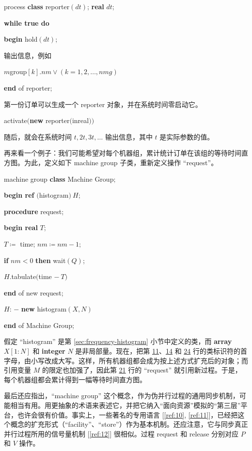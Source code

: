 \quad process \textbf{class} reporter$(dt)$; \textbf{real} $dt$;

\quad \textbf{while true do}

\quad \textbf{}\textbf{begin} hold$(dt)$;

\quad \quad 输出信息，例如

\quad \quad $m$group$[k].nm \lor (k = 1, 2, \dots,nmg)$

\quad \textbf{end} of reporter;

第一份订单可以生成一个 reporter 对象，并在系统时间零启动它。

\quad activate$($\textbf{new} reporter$($inreal$))$

\noindent
随后，就会在系统时间 $t, 2t, 3t, \dots$ 输出信息，其中 $t$ 是实际参数的值。

再来看一个例子：我们可能希望对每个机器组，累计统计订单在该组的等待时间直方图。为此，定义如下 machine group 子类，重新定义操作 ``request''。

\quad machine group \textbf{class} Machine Group;

\quad \textbf{begin ref} $($histogram$)\ H$;

\quad \quad \textbf{procedure} request;

\quad \quad \textbf{begin real} $T$;

\quad \quad \quad $T\coloneq$ time; $nm\coloneq nm - 1$;

\quad \quad \quad \textbf{if} $nm < 0$ \textbf{then} wait$(Q)$;

\quad \quad \quad $H$.tabulate$($time $-\ T)$

\quad \quad \textbf{end} of new request;

\quad \quad $H$: $-$ \textbf{new} histogram$(X, N)$

\quad \textbf{end} of Machine Group;

假定 ``histogram'' 是第 \ref{sec:frequency-histogram} 小节中定义的类，而 \textbf{array} $X[1 : N]$ 和 \textbf{integer} $N$ 是非局部量。现在，把第 \hyperref[pg:program-job-shop-11]{11}、\hyperref[pg:program-job-shop-14]{14} 和 \hyperref[pg:program-job-shop-24]{24} 行的类标识符的首字母，由小写改成大写。这样，所有机器组都会成为按上述方式扩充后的对象；而引用变量 $M$ 的限定也加强了，因此第 \hyperref[pg:program-job-shop-21]{21} 行的 ``request'' 就引用新过程。于是，每个机器组都会累计得到一幅等待时间直方图。

最后还应指出，``machine group'' 这个概念，作为伪并行过程的通用同步机制，可能相当有用。用更抽象的术语来表述它，并把它纳入“面向资源”模拟的“第三层”平台，也许会很有价值。事实上，一些著名的专用语言 [\ref{ref:10}, \ref{ref:11}]，已经把这个概念的扩充形式（``facility''、``store''）作为基本机制。还应注意，它与同步真正并行过程所用的信号量机制 [\ref{ref:12}] 很相似。过程 request 和 release 分别对应 $P$ 和 $V$ 操作。

